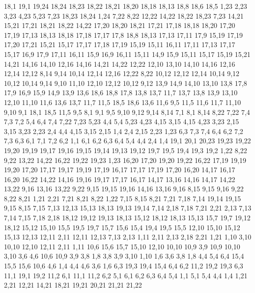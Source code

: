 18,1
19,1
19,24
18,24
18,23
18,22
18,21
18,20
18,18
18,13
18,8
18,6
18,5
%
1,23
2,23
3,23
4,23
5,23
7,23
18,23
18,24
1,24
%
7,22
8,22
12,22
14,22
18,22
18,23
7,23
%
14,21
15,21
17,21
18,21
18,22
14,22
%
17,20
18,20
18,21
17,21
%
17,18
18,18
18,20
17,20
17,19
%
17,13
18,13
18,18
17,18
17,17
%
17,8
18,8
18,13
17,13
17,11
17,9
%
15,19
17,19
17,20
17,21
15,21
%
15,17
17,17
17,18
17,19
15,19
%
15,11
16,11
17,11
17,13
17,17
15,17
%
16,9
17,9
17,11
16,11
%
15,9
16,9
16,11
15,11
%
14,9
15,9
15,11
15,17
15,19
15,21
14,21
14,16
14,10
%
12,16
14,16
14,21
14,22
12,22
%
12,10
13,10
14,10
14,16
12,16
12,14
12,12
%
8,14
9,14
10,14
12,14
12,16
12,22
8,22
%
10,12
12,12
12,14
10,14
%
9,12
10,12
10,14
9,14
%
9,10
11,10
12,10
12,12
10,12
9,12
%
13,9
14,9
14,10
13,10
%
13,8
17,8
17,9
16,9
15,9
14,9
13,9
%
13,6
18,6
18,8
17,8
13,8
13,7
%
11,7
13,7
13,8
13,9
13,10
12,10
11,10
%
11,6
13,6
13,7
11,7
%
11,5
18,5
18,6
13,6
11,6
%
9,5
11,5
11,6
11,7
11,10
9,10
%
9,1
18,1
18,5
11,5
9,5
%
8,1
9,1
9,5
9,10
9,12
9,14
8,14
%
7,1
8,1
8,14
8,22
7,22
7,4
7,3
7,2
%
5,4
6,4
7,4
7,22
7,23
5,23
%
4,4
5,4
5,23
4,23
4,15
%
3,15
4,15
4,23
3,23
%
2,15
3,15
3,23
2,23
%
2,4
4,4
4,15
3,15
2,15
%
1,4
2,4
2,15
2,23
1,23
%
6,3
7,3
7,4
6,4
%
6,2
7,2
7,3
6,3
%
6,1
7,1
7,2
6,2
%
1,1
6,1
6,2
6,3
6,4
5,4
4,4
2,4
1,4
19,1
20,1
20,23
19,23
19,22
19,20
19,19
19,17
19,16
19,15
19,14
19,13
19,12
19,7
19,5
19,4
19,3
19,2
%
1,22
8,22
9,22
13,22
14,22
16,22
19,22
19,23
1,23
%
16,20
17,20
19,20
19,22
16,22
%
17,19
19,19
19,20
17,20
%
17,17
19,17
19,19
17,19
%
16,17
17,17
17,19
17,20
16,20
%
14,17
16,17
16,20
16,22
14,22
%
14,16
19,16
19,17
17,17
16,17
14,17
%
13,16
14,16
14,17
14,22
13,22
%
9,16
13,16
13,22
9,22
%
9,15
19,15
19,16
14,16
13,16
9,16
%
8,15
9,15
9,16
9,22
8,22
8,21
%
1,21
2,21
7,21
8,21
8,22
1,22
%
7,15
8,15
8,21
7,21
7,18
%
7,14
19,14
19,15
9,15
8,15
7,15
%
7,13
12,13
15,13
18,13
19,13
19,14
7,14
%
2,18
7,18
7,21
2,21
%
2,13
7,13
7,14
7,15
7,18
2,18
%
18,12
19,12
19,13
18,13
%
15,12
18,12
18,13
15,13
%
15,7
19,7
19,12
18,12
15,12
15,10
%
15,5
19,5
19,7
15,7
15,6
%
15,4
19,4
19,5
15,5
%
12,10
15,10
15,12
15,13
12,13
12,11
%
2,11
12,11
12,13
7,13
2,13
%
1,11
2,11
2,13
2,18
2,21
1,21
%
1,10
3,10
10,10
12,10
12,11
2,11
1,11
%
10,6
15,6
15,7
15,10
12,10
10,10
10,9
%
3,9
10,9
10,10
3,10
%
3,6
4,6
10,6
10,9
3,9
3,8
%
1,8
3,8
3,9
3,10
1,10
%
1,6
3,6
3,8
1,8
%
4,4
5,4
6,4
15,4
15,5
15,6
10,6
4,6
%
1,4
4,4
4,6
3,6
1,6
%
6,3
19,3
19,4
15,4
6,4
%
6,2
11,2
19,2
19,3
6,3
%
11,1
19,1
19,2
11,2
%
6,1
11,1
11,2
6,2
%
5,1
6,1
6,2
6,3
6,4
5,4
%
1,1
5,1
5,4
4,4
1,4
1,21
2,21
12,21
14,21
18,21
19,21
20,21
21,21
21,22
